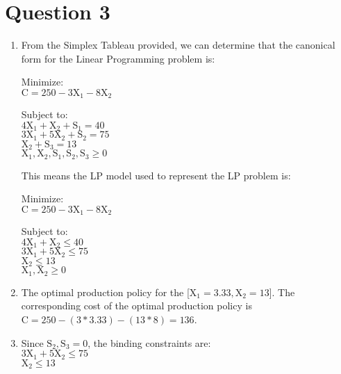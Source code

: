 \section*{Question 3}
\begin{enumerate}

\item
From the Simplex Tableau provided, we can determine that the canonical form for the Linear Programming problem is:

Minimize:\\
$\text{C} = 250 - 3\text{X}_1 - 8\text{X}_2$

Subject to:\\
$4\text{X}_1 + \text{X}_2 + \text{S}_1 = 40$ \\
$3\text{X}_1 + 5\text{X}_2 + \text{S}_2 = 75$ \\
$\text{X}_2 + \text{S}_3 = 13$ \\
$\text{X}_1, \text{X}_2, \text{S}_1, \text{S}_2, \text{S}_3 \geq 0$

This means the LP model used to represent the LP problem is:

Minimize:\\
$\text{C} = 250 - 3\text{X}_1 - 8\text{X}_2$

Subject to:\\
$4\text{X}_1 + \text{X}_2 \leq 40$ \\
$3\text{X}_1 + 5\text{X}_2 \leq 75$ \\
$\text{X}_2 \leq 13$ \\
$\text{X}_1, \text{X}_2 \geq 0$

	
\item
The optimal production policy for the [$\text{X}_1 = 3.33, \text{X}_2 = 13$]. The corresponding cost of the optimal production policy is $\text{C} = 250 - (3*3.33) - (13*8) = 136$.

\item
Since $\text{S}_2, \text{S}_3 = 0$, the binding constraints are:\\
$3\text{X}_1 + 5\text{X}_2 \leq 75$ \\
$\text{X}_2 \leq 13$ \\

\end{enumerate}